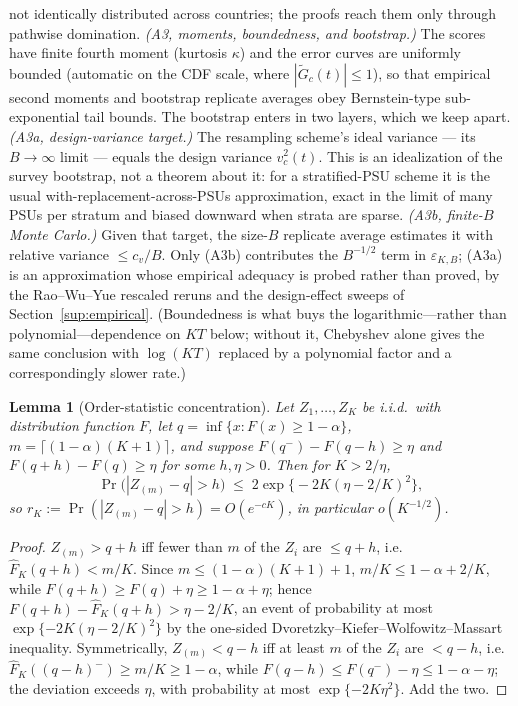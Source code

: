 \documentclass[12pt]{article}
\newtheorem{lemma}{Lemma}
\theoremstyle{definition}
\theoremstyle{remark}
\newcommand{\Gtilde}{\widetilde{G}}
\begin{document}
not identically distributed across countries; the proofs reach them only
through pathwise domination.
\emph{(A3, moments, boundedness, and bootstrap.)} The scores have finite fourth
moment (kurtosis $\kappa$) and the error curves are uniformly bounded (automatic on
the CDF scale, where $|\Gtilde_c(t)|\le1$), so that empirical second moments
and bootstrap replicate averages obey Bernstein-type sub-exponential tail bounds.
The bootstrap enters in two layers, which we keep apart.
\emph{(A3a, design-variance target.)} The resampling scheme's ideal variance
--- its $B\to\infty$ limit --- equals the design variance $v_c^2(t)$. This is
an idealization of the survey bootstrap, not a theorem about it: for a
stratified-PSU scheme it is the usual with-replacement-across-PSUs
approximation, exact in the limit of many PSUs per stratum and biased
downward when strata are sparse.
\emph{(A3b, finite-$B$ Monte Carlo.)} Given that target, the size-$B$
replicate average estimates it with relative variance $\le c_v/B$.
Only (A3b) contributes the $B^{-1/2}$ term in $\varepsilon_{K,B}$; (A3a) is
an approximation whose empirical adequacy is probed rather than proved, by
the Rao--Wu--Yue rescaled reruns and the design-effect sweeps of
Section~\ref{sup:empirical}. (Boundedness is what buys the
logarithmic---rather than polynomial---dependence on $KT$ below; without it,
Chebyshev alone gives the same conclusion with $\log(KT)$ replaced by a
polynomial factor and a correspondingly slower rate.)

\begin{lemma}[Order-statistic concentration]\label{lem:orderstat}
Let $Z_1,\dots,Z_K$ be i.i.d.\ with distribution function $F$, let
$q=\inf\{x:F(x)\ge1-\alpha\}$, $m=\lceil(1-\alpha)(K{+}1)\rceil$, and suppose
$F(q^-)-F(q-h)\ge\eta$ and $F(q+h)-F(q)\ge\eta$ for some
$h,\eta>0$. Then for $K>2/\eta$,
\[
\Pr\big(|Z_{(m)}-q|>h\big)\;\le\;2\exp\!\big\{-2K(\eta-2/K)^2\big\},
\]
so $r_K:=\Pr(|Z_{(m)}-q|>h)=O(e^{-cK})$, in particular $o(K^{-1/2})$.
\end{lemma}

\begin{proof}
$Z_{(m)}>q+h$ iff fewer than $m$ of the $Z_i$ are $\le q+h$, i.e.\
$\widehat F_K(q+h)<m/K$. Since $m\le(1-\alpha)(K{+}1)+1$, $m/K\le1-\alpha+2/K$,
while $F(q+h)\ge F(q)+\eta\ge1-\alpha+\eta$; hence
$F(q+h)-\widehat F_K(q+h)>\eta-2/K$, an event of probability at most
$\exp\{-2K(\eta-2/K)^2\}$ by the one-sided Dvoretzky--Kiefer--Wolfowitz--Massart
inequality. Symmetrically, $Z_{(m)}<q-h$ iff at least $m$ of the $Z_i$ are
$<q-h$, i.e.\ $\widehat F_K((q-h)^-)\ge m/K\ge1-\alpha$, while
$F(q-h)\le F(q^-)-\eta\le1-\alpha-\eta$; the deviation exceeds $\eta$, with
probability at most $\exp\{-2K\eta^2\}$. Add the two.
\end{proof}
\end{document}
